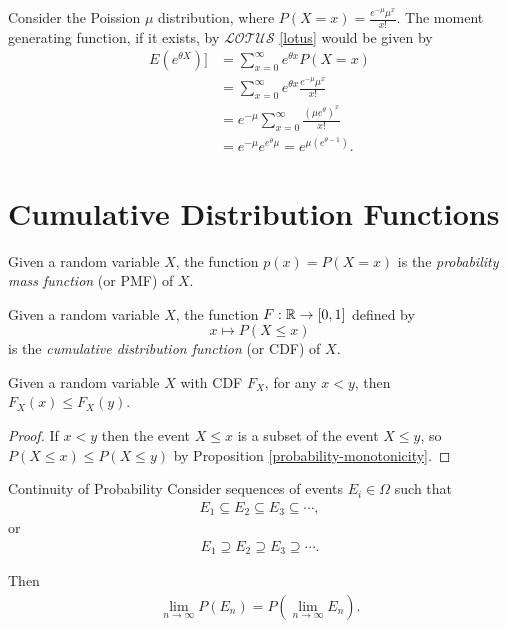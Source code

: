 \begin{exmp}
    Consider the Poission $\mu$ distribution, where $P(X = x) = \frac{e^{-\mu}\mu^x}{x!}$. The moment generating function, if it exists, by $\mathcal{LOTUS}$ \ref{lotus} would be given by
    \begin{align*}
       E(e^{\theta X})] &= \sum_{x=0}^{\infty}e^{\theta x}P(X = x) \\
       &= \sum_{x=0}^{\infty}e^{\theta x}\frac{e^{-\mu}\mu^x}{x!} \\
       &= e^{-\mu}\sum_{x=0}^{\infty}\frac{\left(\mu e^{\theta}\right)^{x}}{x!} \\
       &= e^{-\mu}e^{e^{\theta}\mu} = e^{\mu(e^{\theta-1})}.
    \end{align*}
\end{exmp}

\section{Cumulative Distribution Functions}

\begin{defn}
    Given a random variable $X$, the function $p(x) = P(X = x)$ is the \emph{probability mass function} (or PMF) of $X$.
\end{defn}

\begin{defn}
    Given a random variable $X$, the function $F: \mathbb{R} \to [0, 1]$ defined by
    \[x \mapsto P(X \leq x)\]
    is the \emph{cumulative distribution function} (or CDF) of $X$.
\end{defn}

\begin{prop}
    Given a random variable $X$ with CDF $F_X$, for any $x < y$, then $F_X(x) \leq F_X(y)$.
\end{prop}

\begin{proof}
    If $x < y$ then the event $X \leq x$ is a subset of the event $X \leq y$, so $P(X \leq x) \leq P(X \leq y)$ by Proposition \ref{probability-monotonicity}.
\end{proof}

\begin{thm}{Continuity of Probability}\label{continuity-of-probability}\proofbreak
    Consider sequences of events $E_i \in \Omega$ such that
    \begin{align*}
        E_1 \subseteq E_2 \subseteq E_3 \subseteq \cdots,
    \end{align*}
    or
    \begin{align*}
        E_1 \supseteq E_2 \supseteq E_3 \supseteq \cdots.
    \end{align*}

    Then
    \begin{align*}
        \lim_{n \to \infty}P(E_n) = P\left(\lim_{n \to \infty}E_n\right).
    \end{align*}
\end{thm}

